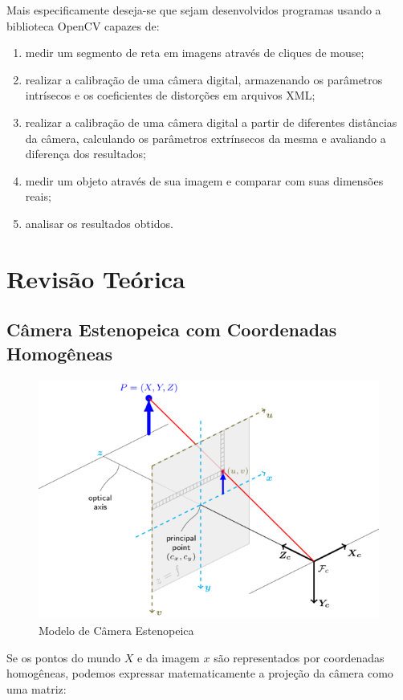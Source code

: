 \documentclass[conference]{IEEEtran}
\begin{document}
Mais especificamente deseja-se que sejam desenvolvidos programas usando a biblioteca OpenCV capazes de:
\begin{enumerate}
\item medir um segmento de reta em imagens através de cliques de mouse;
\item realizar a calibração de uma câmera digital, armazenando os parâmetros intrísecos e os coeficientes de distorções em arquivos XML;
\item realizar a calibração de uma câmera digital a partir de diferentes distâncias da câmera, calculando os parâmetros extrínsecos da mesma e avaliando a diferença dos resultados;
\item medir um objeto através de sua imagem e comparar com suas dimensões reais;
\item analisar os resultados obtidos.
\end{enumerate}
\section{Revisão Teórica}

\subsection{Câmera Estenopeica com Coordenadas Homogêneas}

\begin{figure}[ht!]
\begin{center}
\includegraphics[width=0.75\columnwidth]{pinhole.png}
\caption{Modelo de Câmera Estenopeica\cite{docsopencv}}
\end{center}
\end{figure}

Se os pontos do mundo \(X\) e da imagem \(x\) são representados por coordenadas homogêneas, podemos expressar matematicamente a projeção da câmera como uma matriz\cite{tese}:
\end{document}
